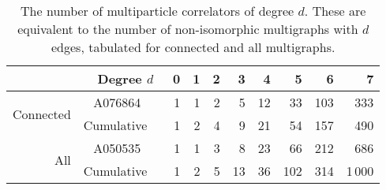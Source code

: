\documentclass[aps,prd,floatfix,preprintnumbers,twocolumn,groupedaddress,nofootinbib,longbibliography,10pt]{revtex4-1}
\providecommand{\href}[2]{#2}
\begin{document}
\begin{table}[t]
\begin{tabular}{rr|rrrrrrrr}
\hline\hline
 & \multicolumn{1}{r|}{Degree $d$\quad\quad} &\, 0 & 1 & 2 & 3 & 4 & 5  & 6 & 7 \\ \hline \hline
\multirow{2}{18mm}{Connected}  & \href{https://oeis.org/A076864}{A076864}~\cite{oeisA076864} \,&\, 1 & 1 & 2 & 5 & 12 & 33 & 103 & 333  \\ 
 & Cumulative \,&\, 1 & 2 & 4 & 9 & 21 & 54 & 157 & 490 \\  \hline
\multirow{2}{18mm}{All} & \href{https://oeis.org/A050535}{A050535}~\cite{oeisA050535} \,&\, 1 & 1 & 3 & 8 & 23 & 66 & 212 & 686 \\
 & Cumulative \,&\, 1 & 2 & 5 & 13 & 36 & 102 & 314 & 1\,000 \\
 \hline\hline
\end{tabular}
\caption{\label{tab:oeisnumgraphs}
%
The number of multiparticle correlators of degree $d$.
%
These are equivalent to the number of non-isomorphic multigraphs with $d$ edges, tabulated for connected and all multigraphs.}
\end{table}
\end{document}
